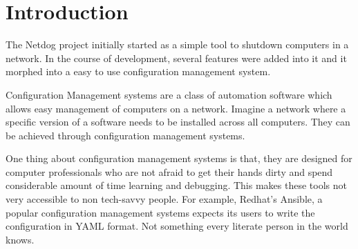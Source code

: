 \chapter{Introduction}
	
\par
The Netdog project initially started as a simple tool to shutdown computers in a
network. In the course of development, several features were added into it and
it morphed into a easy to use configuration management system.

\par
Configuration Management systems are a class of automation software which allows
easy management of computers on a network. Imagine a network where a specific
version of a software needs to be installed across all computers. They can be
achieved through configuration management systems.

\par
One thing about configuration management systems is that, they are designed for
computer professionals who are not afraid to get their hands dirty and spend
considerable amount of time learning and debugging. This makes these tools not
very accessible to non tech-savvy people. For example, Redhat's Ansible, a
popular configuration management systems expects its users to write the
configuration in YAML format. Not something every literate person in the world
knows.

\par



\newpage 

